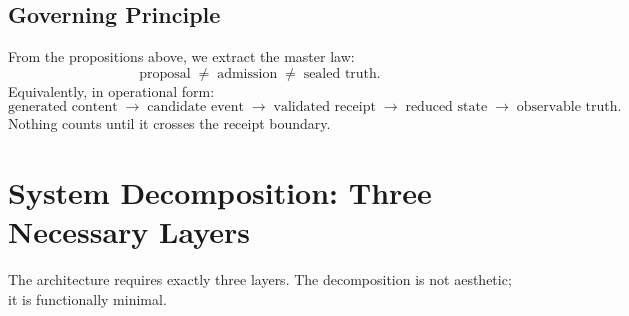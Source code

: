 \documentclass[11pt,a4paper]{article}
\theoremstyle{plain}
\theoremstyle{definition}
\theoremstyle{remark}
\begin{document}
\subsection{Governing Principle}

From the propositions above, we extract the master law:
\[
  \text{proposal} \;\neq\; \text{admission} \;\neq\; \text{sealed truth.}
\]
Equivalently, in operational form:
\[
  \text{generated content}
  \;\to\; \text{candidate event}
  \;\to\; \text{validated receipt}
  \;\to\; \text{reduced state}
  \;\to\; \text{observable truth.}
\]
Nothing counts until it crosses the receipt boundary.

\section{System Decomposition: Three Necessary Layers}
\label{sec:layers}

The architecture requires exactly three layers.
The decomposition is not aesthetic; it is functionally minimal.
\end{document}
